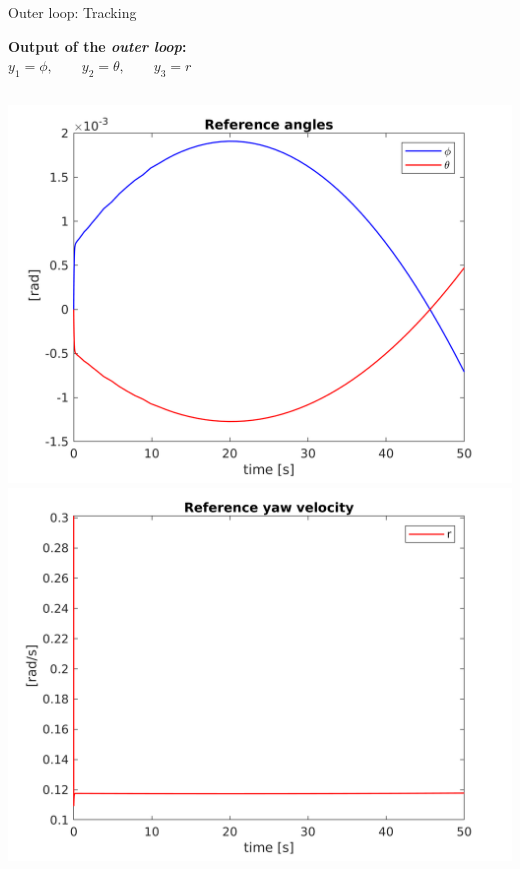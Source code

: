 \begin{frame}[fragile]{Outer loop: Tracking }
  \begin{center}
  \textbf{Output of the \textsl{outer loop}:}\\
  $y_1 = \phi, \qquad y_2 = \theta, \qquad y_3 = r$
  \end{center}
  \begin{columns}
    \includegraphics[width=\linewidth]{../report/Images/AngleOuter}
    \includegraphics[width=\linewidth]{../report/Images/velOuter}
  \end{columns}

\end{frame}

